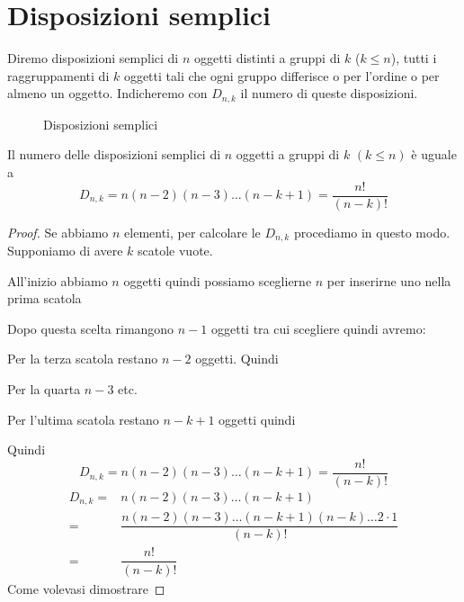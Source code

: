 \section{Disposizioni semplici}
\begin{defn}
Diremo disposizioni semplici di $n$ oggetti distinti a gruppi di $k$ ($ k\leqslant n$), tutti i raggruppamenti di $k$ oggetti tali che ogni gruppo differisce o per l'ordine o per almeno un oggetto. Indicheremo con $D_{n,k}$ il numero di queste disposizioni.
\end{defn}
\begin{figure}
	\centering
	
	\caption{Disposizioni semplici}
	\label{fig:dispsemplici}
\end{figure}
\begin{thm}
	Il numero delle disposizioni semplici di $n$ oggetti a gruppi di $k$ $(k\leqslant n)$ è uguale a
	\[D_{n,k}=n(n-2)(n-3)\dots(n-k+1)=\dfrac{n!}{(n-k)!}\]
\end{thm}
\begin{proof}
	Se abbiamo $n$ elementi, per calcolare le $D_{n,k}$  procediamo in questo modo. Supponiamo di avere $k$ scatole vuote.\par 
	\makebox[\linewidth]{\scatola{}\scatola{}\scatola{}\scatola{},\dots,\scatola{}}\par
	All'inizio abbiamo $n$ oggetti quindi possiamo sceglierne $n$ per inserirne uno nella prima scatola\par 
	\par
	Dopo questa scelta rimangono $n-1$ oggetti tra cui scegliere quindi avremo:\par 
	\par
	Per la terza scatola restano $n-2$ oggetti. Quindi\par 
	\par
	Per la quarta $n-3$ etc.\par {}\par Per l'ultima scatola restano $n-k+1$ oggetti  quindi \par {}\par Quindi \[D_{n,k}=n(n-2)(n-3)\dots(n-k+1)=\dfrac{n!}{(n-k)!}\]
	\begin{align*}
	D_{n,k}=&n(n-2)(n-3)\dots(n-k+1)\\
	=&\dfrac{n(n-2)(n-3)\dots(n-k+1)(n-k)\dots 2\cdot 1}{(n-k)!}\\
	=&\dfrac{n!}{(n-k)!}
	\end{align*}
	Come volevasi dimostrare
\end{proof}
